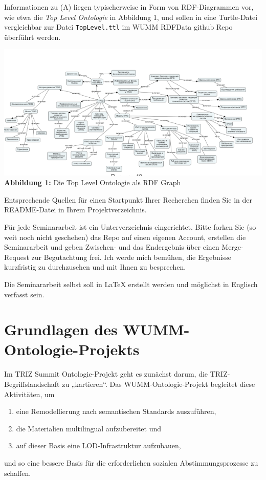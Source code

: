 \documentclass[11pt,a4paper]{article}
\begin{document}
Informationen zu (A) liegen typischerweise in Form von RDF-Diagrammen vor, wie
etwa die \emph{Top Level Ontologie} in Abbildung 1, und sollen in eine
Turtle-Datei vergleichbar zur Datei \texttt{TopLevel.ttl} im WUMM RDFData
github Repo überführt werden. 

\begin{center}
  \includegraphics[width=\textwidth]{3.png}\\
  \textbf{Abbildung 1:} Die Top Level Ontologie als RDF Graph
\end{center}

Entsprechende Quellen für einen Startpunkt Ihrer Recherchen finden Sie in der
README-Datei in Ihrem Projektverzeichnis.

Für jede Seminararbeit ist ein Unterverzeichnis eingerichtet. Bitte forken Sie
(so weit noch nicht geschehen) das Repo auf einen eigenen Account, erstellen
die Seminararbeit und geben Zwischen- und das Endergebnis über einen
Merge-Request zur Begutachtung frei. Ich werde mich bemühen, die Ergebnisse
kurzfristig zu durchzusehen und mit Ihnen zu besprechen.

Die Seminararbeit selbst soll in {\LaTeX} erstellt werden und möglichst in
Englisch verfasst sein.

\section{Grundlagen des WUMM-Ontologie-Projekts}

Im TRIZ Summit Ontologie-Projekt geht es zunächst darum, die
TRIZ-Begriffslandschaft zu „kartieren“.  Das WUMM-Ontologie-Projekt begleitet
diese Aktivitäten, um
\begin{enumerate}[noitemsep]
\item eine Remodellierung nach semantischen Standards auszuführen,
\item die Materialien multilingual aufzubereitet und
\item auf dieser Basis eine LOD-Infrastruktur aufzubauen,
\end{enumerate}
und so eine bessere Basis für die erforderlichen sozialen Abstimmungsprozesse
zu schaffen.
\end{document}
